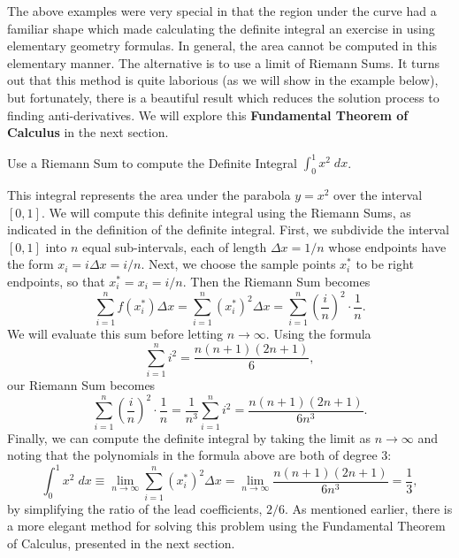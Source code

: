 \documentclass[handout]{ximera}
\begin{document}
The above examples were very special in that the region under the curve had a familiar shape which
made calculating the definite integral an exercise in using elementary geometry formulas. 
In general, the area cannot be computed in this elementary manner.  
The alternative is to use a limit of Riemann Sums.  It turns out that this method is quite laborious (as we will show in the example below), but 
fortunately, there is a beautiful result which reduces the solution process to finding anti-derivatives. 
We will explore this \textbf{Fundamental Theorem of Calculus} in the next section.

\begin{example}[example 5]
Use a Riemann Sum to compute the Definite Integral $\displaystyle{\int_0^1 x^2 \; dx}$.

This integral represents the area under the parabola $y = x^2$ over the interval $[0,1]$. 
We will compute this definite integral using the Riemann Sums, as indicated in the definition of the definite integral.
First, we subdivide the interval $[0,1]$ into $n$ equal sub-intervals, each of length 
$\Delta x= 1/n$ whose endpoints have the form $x_i = i\Delta x = i/n$.  Next, we choose the sample points $x_i^*$
to be right endpoints, so that $x_i^* = x_i = i/n$. Then the Riemann Sum becomes
\[
\sum_{i = 1}^n f(x_i^*) \Delta x =  \sum_{i = 1}^n \left(x_i^*\right)^2 \Delta x = \sum_{i = 1}^n \left(\frac{i}{n}\right)^2 \cdot \frac{1}{n}.
\]
We will evaluate this sum before letting $n\to \infty$. Using the formula
\[
\sum_{i = 1}^n i^2 = \frac{n(n+1)(2n+1)}{6},
\]
our Riemann Sum becomes
\[
\sum_{i = 1}^n \left(\frac{i}{n}\right)^2 \cdot \frac{1}{n} = \frac{1}{n^3} \sum_{i = 1}^n i^2 = \frac{n(n+1)(2n+1)}{6n^3}.
\]
Finally, we can compute the definite integral by taking the limit as $n \to \infty$ and noting that the polynomials in the formula above are both of degree 3:
\[
\int_0^1 x^2 \; dx \equiv \lim_{n \to \infty} \sum_{i = 1}^n \left(x_i^*\right)^2 \Delta x = \lim_{n \to \infty} \frac{n(n+1)(2n+1)}{6n^3} = \frac{1}{3},
\]
by simplifying the ratio of the lead coefficients, $2/6$.
As mentioned earlier, there is a more elegant method for solving this problem using the Fundamental Theorem of Calculus, presented in the next section.

\end{example}
\end{document}
